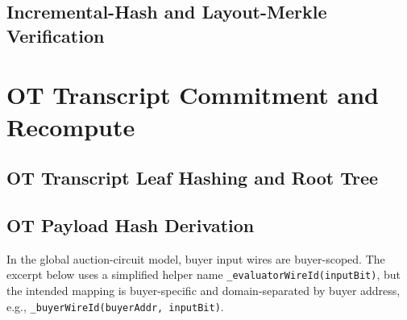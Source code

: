 \documentclass[final,twoside]{vutinfth}
\begin{document}


\section{Incremental-Hash and Layout-Merkle Verification}
\label{app:b3}






\chapter{OT Transcript Commitment and Recompute}
\label{app:ot}
\section{OT Transcript Leaf Hashing and Root Tree}
\label{app:c1}




\section{OT Payload Hash Derivation}
\label{app:c2}
In the global auction-circuit model, buyer input wires are buyer-scoped. The
excerpt below uses a simplified helper name
\texttt{\_evaluatorWireId(inputBit)}, but the intended mapping is buyer-specific
and domain-separated by buyer address, e.g.,
\texttt{\_buyerWireId(buyerAddr, inputBit)}.

\end{document}
